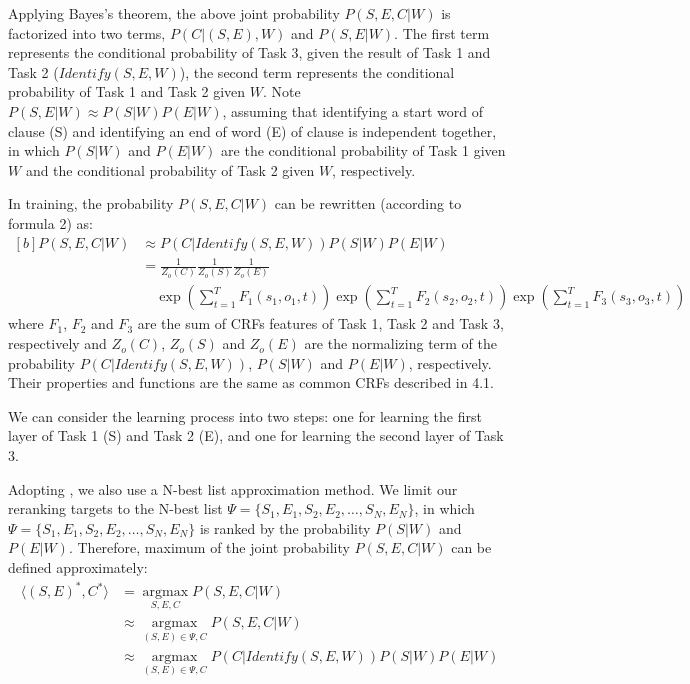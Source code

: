 \documentclass[english]{jnlp_1.4}
\begin{document}
Applying Bayes's theorem, the above joint probability $P(S,E,C|W)$
is factorized into two terms, $P(C|(S,E),W)$ and $P(S,E|W)$. The
first term represents the conditional probability of Task 3, given
the result of Task 1 and Task 2 ($\mathit{Identify}(S,E,W)$), the second
term represents the conditional probability of Task 1 and Task 2
given $W$. Note $P(S,E|W) \approx P(S|W)P(E|W)$, assuming that
identifying a start word of clause (S) and identifying an end of
word (E) of clause is independent together, in which $P(S|W)$ and
$P(E|W)$ are the conditional probability of Task 1 given $W$ and
the conditional probability of Task 2 given $W$, respectively.

In training, the probability $P(S,E,C|W)$ can be rewritten
(according to formula 2) as:
\begin{equation}
\begin{aligned}[b]
 P(S,E,C|W) & \approx P(C|Identify(S,E,W))P(S|W)P(E|W) \\
         & = \frac{1}{Z_o(C)}\frac{1}{Z_o(S)}
         \frac{1}{Z_o(E)} \\
         & \quad \exp\left(\sum_{t=1}^{T} F_1(s_1, o_1,t)\right) \exp\left(\sum_{t=1}^{T} F_2(s_2,
         o_2,t)\right)\exp\left(\sum_{t=1}^{T} F_3(s_3, o_3,t)\right)
\end{aligned}
\end{equation}
where $F_1$, $F_2$ and $F_3$ are the sum of CRFs features
of Task 1, Task 2 and Task 3, respectively and $Z_o(C)$, $Z_o(S)$
and $Z_o(E)$ are the normalizing term of the probability
$P(C|Identify(S,E,W))$, $P(S|W)$ and $P(E|W)$, respectively. Their
properties and functions are the same as common CRFs described in
4.1.

We can consider the learning process into two steps: one for
learning the first layer of Task 1 (S) and Task 2 (E), and one for
learning the second layer of Task 3.



Adopting \cite{Shi2007}, we also use a N-best list approximation
method. We limit our reranking targets to the N-best list $\Psi =
\{S_1, E_1, S_2, E_2, \dots, S_N, E_N\}$, in which $\Psi = \{S_1,
E_1, S_2, E_2, \dots, S_N, E_N\}$ is ranked by the probability
$P(S|W)$ and $P(E|W)$. Therefore, maximum of the joint probability
$P(S,E,C|W)$ can be defined approximately:
\begin{align}
\langle (S,E)^*,C^*\rangle & = \mathop {\arg\max}\limits_{S,E,C}P(S,E,C|W)\nonumber \\
      & \approx \mathop {\arg \max}\limits_{(S,E) \in \Psi,C}P(S,E,C|W)\\
      & \approx \mathop {\arg \max}\limits_{(S,E) \in \Psi,C}P(C|Identify(S,E,W))P(S|W)P(E|W)
\end{align}
\end{document}
